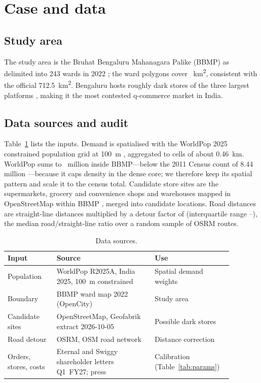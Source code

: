 \section{Case and data}\label{sec:data}

\subsection{Study area}

The study area is the Bruhat Bengaluru Mahanagara Palike (BBMP) as delimited into 243 wards in 2022 \citep{opencity2022wards}; the ward polygons cover \AreaKm~km\textsuperscript{2}, consistent with the official 712.5~km\textsuperscript{2}. Bengaluru hosts roughly \CurrentStores{} dark stores of the three largest platforms \citep{qcmap2026}, making it the most contested q-commerce market in India.

\subsection{Data sources and audit}

Table~\ref{tab:sources} lists the inputs. Demand is spatialised with the WorldPop 2025 constrained population grid at 100~m \citep{worldpop2025}, aggregated to \NDemandCells{} cells of about 0.46~km. WorldPop sums to \PopWorldPop~million inside BBMP---below the 2011 Census count of 8.44 million \citep{census2011}---because it caps density in the dense core; we therefore keep its spatial pattern and scale it to the census total. Candidate store sites are the \NOsmSites{} supermarkets, grocery and convenience shops and warehouses mapped in OpenStreetMap within BBMP \citep{osm2026}, merged into \NCandidates{} candidate locations. Road distances are straight-line distances multiplied by a detour factor of \Detour{} (interquartile range \DetourLo--\DetourHi), the median road/straight-line ratio over a random sample of OSRM routes.

\begin{table}[t]
\centering\small
\caption{Data sources.}\label{tab:sources}
\begin{tabular}{p{0.20\linewidth}p{0.40\linewidth}p{0.28\linewidth}}
\toprule
Input & Source & Use \\
\midrule
Population & WorldPop R2025A, India 2025, 100~m constrained & Spatial demand weights \\
Boundary & BBMP ward map 2022 (OpenCity) & Study area \\
Candidate sites & OpenStreetMap, Geofabrik extract 2026-10-05 & Possible dark stores \\
Road detour & OSRM, OSM road network & Distance correction \\
Orders, stores, costs & Eternal and Swiggy shareholder letters Q1~FY27; press & Calibration (Table~\ref{tab:params}) \\
\bottomrule
\end{tabular}
\end{table}


